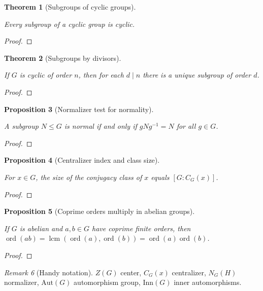 \documentclass[11pt,letterpaper]{article}
\newtheorem{theorem}{Theorem}
\newtheorem{proposition}[theorem]{Proposition}
\theoremstyle{definition}
\theoremstyle{remark}
\newtheorem{remark}[theorem]{Remark}
\newcommand{\Aut}{\mathrm{Aut}}
\newcommand{\Inn}{\mathrm{Inn}}
\newcommand{\lcm}{\operatorname{lcm}}
\newcommand{\uses}[1]{}
\begin{document}
\begin{theorem}[Subgroups of cyclic groups]\label{thm:subgroups_cyclic}
\uses{def:cyclic_group}
Every subgroup of a cyclic group is cyclic.
\end{theorem}
\begin{proof}\end{proof}

\begin{theorem}[Subgroups by divisors]\label{thm:unique_divisor_subgroup}
\uses{def:cyclic_group}
If $G$ is cyclic of order $n$, then for each $d\mid n$ there is a unique subgroup of order $d$.
\end{theorem}
\begin{proof}\uses{thm:subgroups_cyclic}\end{proof}

\begin{proposition}[Normalizer test for normality]\label{prop:normalizer_test}
\uses{def:normal_subgroup}
A subgroup $N\le G$ is normal if and only if $gNg^{-1}=N$ for all $g\in G$.
\end{proposition}
\begin{proof}\end{proof}

\begin{proposition}[Centralizer index and class size]\label{prop:class_size}
\uses{def:action}
For $x\in G$, the size of the conjugacy class of $x$ equals $[G:C_G(x)]$.
\end{proposition}
\begin{proof}\uses{thm:orbit_stabilizer}\end{proof}

\begin{proposition}[Coprime orders multiply in abelian groups]\label{prop:coprime_orders}
\uses{def:order}
If $G$ is abelian and $a,b\in G$ have coprime finite orders, then $\operatorname{ord}(ab)=\lcm(\operatorname{ord}(a),\operatorname{ord}(b))=\operatorname{ord}(a)\operatorname{ord}(b)$.
\end{proposition}
\begin{proof}\end{proof}

\begin{remark}[Handy notation]\label{rem:notation}
$Z(G)$ center, $C_G(x)$ centralizer, $N_G(H)$ normalizer, $\Aut(G)$ automorphism group, $\Inn(G)$ inner automorphisms.
\end{remark}
\end{document}
